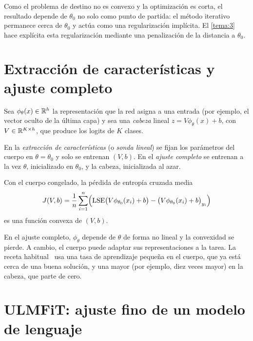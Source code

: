 \addtocounter{definicion}{1}%

\begin{observacion}\label{obs:implicita}
Como el problema de destino no es convexo y la optimización es corta, el resultado depende de $\theta_0$ no solo como punto de partida: el método iterativo permanece cerca de $\theta_0$ y actúa como una regularización implícita. El \cref{tema:3} hace explícita esta regularización mediante una penalización de la distancia a $\theta_0$.
\end{observacion}

\section{Extracción de características y ajuste completo}

Sea $\phi_\theta(x)\in\mathbb{R}^{h}$ la representación que la red asigna a una entrada (por ejemplo, el vector oculto de la última capa) y sea una \emph{cabeza} lineal $z=V\phi_\theta(x)+b$, con $V\in\mathbb{R}^{K\times h}$, que produce los logits de $K$ clases.

\begin{definicion}\label{def:sonda}
En la \emph{extracción de características} (o \emph{sonda lineal}) se fijan los parámetros del cuerpo en $\theta=\theta_0$ y solo se entrenan $(V,b)$. En el \emph{ajuste completo} se entrenan a la vez $\theta$, inicializado en $\theta_0$, y la cabeza, inicializada al azar.
\end{definicion}

\begin{proposicion}\label{prop:sonda-convexa}
Con el cuerpo congelado, la pérdida de entropía cruzada media
\[
J(V,b)=\frac{1}{n}\sum_{i=1}^{n}\Bigl(\operatorname{LSE}\bigl(V\phi_{\theta_0}(x_i)+b\bigr)-\bigl(V\phi_{\theta_0}(x_i)+b\bigr)_{y_i}\Bigr)
\]
es una función convexa de $(V,b)$.
\end{proposicion}

En el ajuste completo, $\phi_\theta$ depende de $\theta$ de forma no lineal y la convexidad se pierde. A cambio, el cuerpo puede adaptar sus representaciones a la tarea. La receta habitual~\cite[§14.2]{d2l} usa una tasa de aprendizaje pequeña en el cuerpo, que ya está cerca de una buena solución, y una mayor (por ejemplo, diez veces mayor) en la cabeza, que parte de cero.

\section{ULMFiT: ajuste fino de un modelo de lenguaje}

